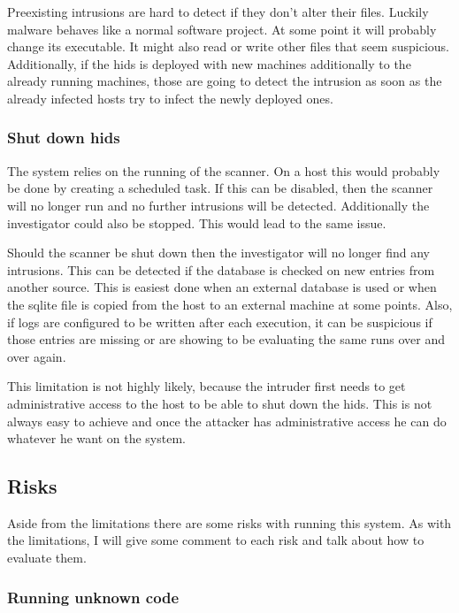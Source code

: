 Preexisting intrusions are hard to detect if they don't alter their files. Luckily malware behaves like a normal software project. At some point it will probably change its executable. It might also read or write other files that seem suspicious. Additionally, if the \gls{hids} is deployed with new machines additionally to the already running machines, those are going to detect the intrusion as soon as the already infected hosts try to infect the newly deployed ones.

\subsubsection{Shut down \gls{hids}}
\label{sec:limitation:noscan}
The system relies on the running of the scanner. On a host this would probably be done by creating a scheduled task. If this can be disabled, then the scanner will no longer run and no further intrusions will be detected. Additionally the investigator could also be stopped. This would lead to the same issue.

Should the scanner be shut down then the investigator will no longer find any intrusions. This can be detected if the database is checked on new entries from another source. This is easiest done when an external database is used or when the sqlite file is copied from the host to an external machine at some points. Also, if logs are configured to be written after each execution, it can be suspicious if those entries are missing or are showing to be evaluating the same runs over and over again. 

This limitation is not highly likely, because the intruder first needs to get administrative access to the host to be able to shut down the \gls{hids}. This is not always easy to achieve and once the attacker has administrative access he can do whatever he want on the system. 

\subsection{Risks}
\label{sec:risk}

Aside from the limitations there are some risks with running this system. As with the limitations, I will give some comment to each risk and talk about how to evaluate them.

\subsubsection{Running unknown code}
\label{sec:risk:unknowncode}

